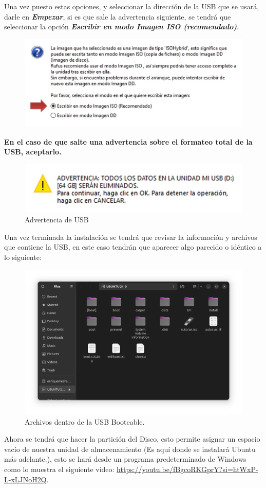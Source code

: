 \documentclass[letter,11pt]{article} %
\begin{document}
\begin{enumerate}
		Una vez puesto estas opciones, y seleccionar la dirección de la USB que se usará, darle en \textit{\textbf{Empezar}}, si es que sale la advertencia siguiente, se tendrá que seleccionar la opción \textit{\textbf{Escribir en modo Imagen ISO (recomendado)}}.
		
		\begin{figure}[H]
			\centering
			\includegraphics[width=0.5\linewidth]{Imagenes/advertencia}
			\caption{}
			\label{fig:advertencia}
		\end{figure}
		
		\textbf{En el caso de que salte una advertencia sobre el formateo total de la USB, aceptarlo.}
		
		\begin{figure}[H]
			\centering
			\includegraphics[width=0.5\linewidth]{Imagenes/adv_usb}
			\caption{Advertencia de USB}
			\label{fig:advusb}
		\end{figure}
		
		Una vez terminada la instalación se tendrá que revisar la información y archivos que contiene la USB, en este caso tendrán que aparecer algo parecido o idéntico a lo siguiente:
		
		\begin{figure}[H]
			\centering
			\includegraphics[width=0.5\linewidth]{Imagenes/carpeta_usb}
			\caption{Archivos dentro de la USB Booteable.}
			\label{fig:carpetausb}
		\end{figure}
		
		Ahora se tendrá que hacer la partición del Disco, esto permite asignar un espacio vacío de nuestra unidad de almacenamiento (Es aquí donde se instalará Ubuntu más adelante.), esto se hará desde un programa predeterminado de Windows como lo muestra el siguiente video: \url{https://youtu.be/fBgcoRKGprY?si=htWxP-L-xLJNoH2Q}.
		

\end{enumerate}
\end{document}
